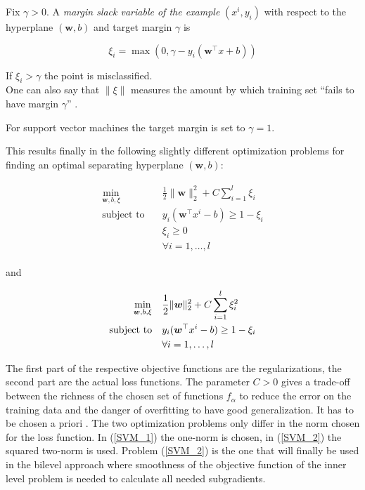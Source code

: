 
Fix \(\gamma > 0\). A \emph{margin slack variable of the example} \((x^i,y_i)\) with respect to the hyperplane \((\bm{w},b)\) and target margin \(\gamma\) is 

\[\xi_i = \max(0, \gamma - y_i(\bm{w}^{\top}x+b))\] 

If \(\xi_i > \gamma\) the point is misclassified. \\
One can also say that \(\|\xi\|\) measures the amount by which training set ``fails to have margin \(\gamma\)'' \cite{Cristianini2000}.

For support vector machines the target margin is set to \(\gamma = 1\).

This results finally in the following slightly different
optimization problems for finding an optimal separating hyperplane \((\bm{w},b)\): 

\begin{align}
\begin{split}
	\min_{\bm{w},b,\xi} \quad & \frac{1}{2} \|\bm{w}\|^2_2+C\sum_{i=1}^l{\xi_i} \\
	\text{subject to} \quad & y_i(\bm{w}^{\top}x^i-b) \geq 1 - \xi_i \\
	& \xi_i \geq 0 \\
	& 	\forall i = 1, \dots , l
\end{split}
\label{SVM_1}
\end{align}

and

\begin{align}
\begin{split}
	\min_{\bm{w},b,\xi} \quad & \frac{1}{2} \|\bm{w}\|^2_2+C\sum_{i=1}^l{\xi_i^2} \vspace{0.5ex}\\
	\text{subject to} \quad & y_i(\bm{w}^{\top}x^i-b) \geq 1 - \xi_i \vspace{0.5ex}\\
	& 	\forall i = 1, \dots , l
\end{split}
\label{SVM_2}
\end{align}

The first part of the respective objective functions are the regularizations, the second part are the actual loss functions. 
The parameter \(C > 0\) gives a trade-off between the richness of the chosen set of functions \(f_{\alpha}\) to reduce the error on the training data and the danger of overfitting to have good generalization. It has to be chosen a priori \cite{Kunapuli2008}.
The two optimization problems only differ in the norm chosen for the loss function. In (\ref{SVM_1}) the one-norm is chosen, in (\ref{SVM_2}) the squared two-norm is used.
Problem (\ref{SVM_2}) is the one that will finally be used in the bilevel approach where smoothness of the objective function of the inner level problem is needed to calculate all needed subgradients.

